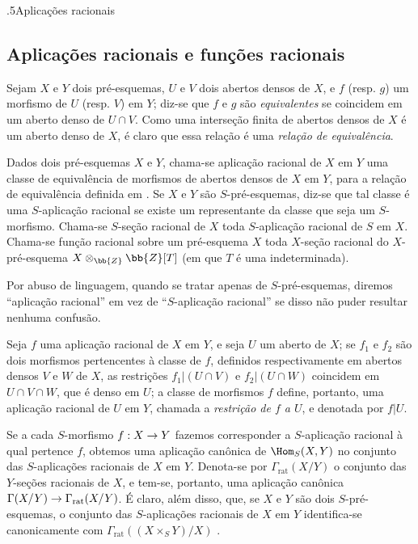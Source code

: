 \documentclass[oneside]{amsart}
\makeatletter
\renewcommand*{\section}{%
  \@startsection{section}{1}{\z@}{.7\linespacing\@plus\linespacing}%
  {.5\linespacing}{\normalfont\bfseries\Large\scshape\centering}}
\newcommand{\ega@arrow}[2]{\mathchoice{#1}{#2}{#2}{#2}}
\renewcommand{\to}{\ega@arrow{\longrightarrow}{\rightarrow}}
\newcommand{\oldpage}[2][]{{\marginnote{\normalfont\textbf{#1}~|~#2}}\ignorespaces}
\let\EGAOriginalLabel\label
\renewcommand{\label}[1]{\phantomsection\EGAOriginalLabel{#1}}
\makeatother
\begin{document}
\section{Aplicações racionais}
\label{section:I.7}

\subsection{Aplicações racionais e funções racionais}
\label{subsection:I.7.1}

\begin{env}[7.1.1]
\label{I.7.1.1}
Sejam $X$ e $Y$ dois pré-esquemas, $U$ e $V$ dois abertos densos de $X$, e $f$ (resp. $g$) um morfismo de $U$ (resp. $V$) em $Y$; diz-se que $f$ e $g$ são \emph{equivalentes} se coincidem em um aberto denso de $U\cap V$.
Como uma interseção finita de abertos densos de $X$ é um aberto denso de $X$, é claro que essa relação é uma \emph{relação de equivalência}.
\end{env}

\begin{definition}[7.1.2]
\label{I.7.1.2}
Dados dois pré-esquemas $X$ e $Y$, chama-se aplicação racional de $X$ em $Y$ uma classe de equivalência de morfismos de abertos densos de $X$ em $Y$, para a relação de equivalência definida em .
Se $X$ e $Y$ são $S$-pré-esquemas, diz-se que tal classe é uma $S$-aplicação racional se existe um representante da classe que seja um $S$-morfismo.
Chama-se $S$-seção racional de $X$ toda $S$-aplicação racional de $S$ em $X$.
Chama-se função racional sobre um pré-esquema $X$ toda $X$-seção racional do $X$-pré-esquema $X\otimes_{\bb{Z}}\bb{Z}[T]$ (em que $T$ é uma indeterminada).

Por abuso de linguagem, quando se tratar apenas de $S$-pré-esquemas, diremos ``aplicação racional'' em vez de ``$S$-aplicação racional'' se disso não puder resultar nenhuma confusão.

Seja $f$ uma aplicação racional de $X$ em $Y$, e seja $U$ um aberto de $X$; se $f_1$ e $f_2$ são dois morfismos pertencentes à classe de $f$, definidos respectivamente em abertos densos $V$ e $W$ de $X$, as restrições $f_1|(U\cap V)$ e $f_2|(U\cap W)$ coincidem em $U\cap V\cap W$, que é denso em $U$; a classe de morfismos $f$ define, portanto, uma aplicação racional de $U$ em $Y$, chamada a \emph{restrição de $f$ a $U$}, e denotada por $f|U$.

Se a cada $S$-morfismo $f:X\to Y$ fazemos corresponder a $S$-aplicação racional
\oldpage[I]{156}
à qual pertence $f$, obtemos uma aplicação canônica de $\Hom_S(X,Y)$ no conjunto das $S$-aplicações racionais de $X$ em $Y$.
Denota-se por $\Gamma_\mathrm{rat}(X/Y)$ o conjunto das $Y$-seções racionais de $X$, e tem-se, portanto, uma aplicação canônica $\Gamma(X/Y)\to\Gamma_\mathrm{rat}(X/Y)$.
É claro, além disso, que, se $X$ e $Y$ são dois $S$-pré-esquemas, o conjunto das $S$-aplicações racionais de $X$ em $Y$ identifica-se canonicamente com $\Gamma_\mathrm{rat}((X\times_S Y)/X)$ .
\end{definition}
\end{document}
